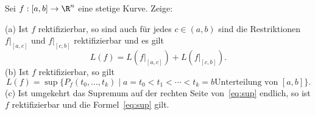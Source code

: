 \begin{prob} 
Sei $f:[a,b]\to\R^n$ eine stetige Kurve. Zeige:

(a) Ist $f$ rektifizierbar, so sind auch f\"ur jedes $c\in(a,b)$ sind
die Restriktionen $f|_{[a,c]}$ und $f|_{[c,b]}$ rektifizierbar und es gilt
$$
   L(f) = L(f|_{[a,c]}) + L(f|_{[c,b]}).
$$
(b) Ist $f$ rektifizierbar, so gilt
\begin{equation}\label{eq:sup}
   L(f) = \sup\{P_f(t_0,\dots,t_k)\mid a=t_0<t_1<\cdots<t_k=b \text{
     Unterteilung von }[a,b]\}.
\end{equation}
(c) Ist umgekehrt das Supremum auf der rechten Seite
von~\eqref{eq:sup} endlich, so ist $f$ rektifizierbar und die
Formel~\eqref{eq:sup} gilt.    
\end{prob}
